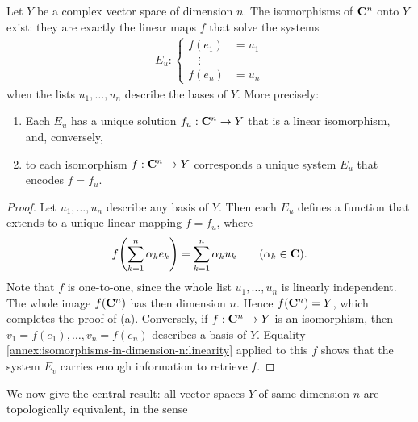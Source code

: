 \begin{lemma}\label{annex:lemma:isomorphisms-in-dimension-n}
Let $Y$ be a complex vector space of dimension $n$. The isomorphisms of $\mathbf{C}^n$ onto $Y$ exist: they are exactly the linear %
maps $f$ that solve the systems
% 
\begin{align} E_u:
  \begin{cases}
    f(e_1) &= u_1 \\
    \mspace{16mu}\vdots& \\\nonumber
    f(e_n) &= u_n
  \end{cases}
\end{align}
% 
%
when the lists $u_1, \dots, u_n$ describe the bases of $Y$. More precisely: 
% 
\begin{enumerate}[item-label=(\alph{enumi})]
  \item Each $E_u$ has a unique solution $f_u: \mathbf{C}^n \to Y$ that is a linear isomorphism, and, conversely, 
  \item to each isomorphism $f: \mathbf{C}^n \to Y$ corresponds a unique system $E_u$ that encodes $f=f_u$.  
\end{enumerate}
% 
\end{lemma}
% 
\begin{proof}
Let $u_1, \dots, u_n$ describe any basis of $Y$. Then each $E_u$ defines a function that extends to a unique linear 
mapping $f=f_u$, where
% 
\begin{equation}\label{annex:isomorphisms-in-dimension-n:linearity}
  f\Biggl(\sum_{k=1}^n \alpha_k e_k\Biggr) = \sum_{k=1}^n \alpha_k u_k \qquad(\alpha_k \in \mathbf{C}).
\end{equation} 
% 
Note that $f$ is one-to-one, since the whole list $u_1, \dots, u_n$ is linearly independent. The whole image $f(\mathbf{C}^n)$ %
has then dimension $n$. Hence $f(\mathbf{C}^n) = Y$, which completes the proof of (a). Conversely, if $f: \mathbf{C}^n \to Y$ is %
an isomorphism, then $v_1= f(e_1), \dots, v_n = f(e_n)$ describes a basis of $Y$. Equality %
\eqref{annex:isomorphisms-in-dimension-n:linearity} applied to this $f$ shows that the system $E_v$ carries enough information 
to retrieve $f$. 
\end{proof}
% 
We now give the central result: all vector spaces $Y$ of same dimension $n$ are topologically equivalent, in the sense %
